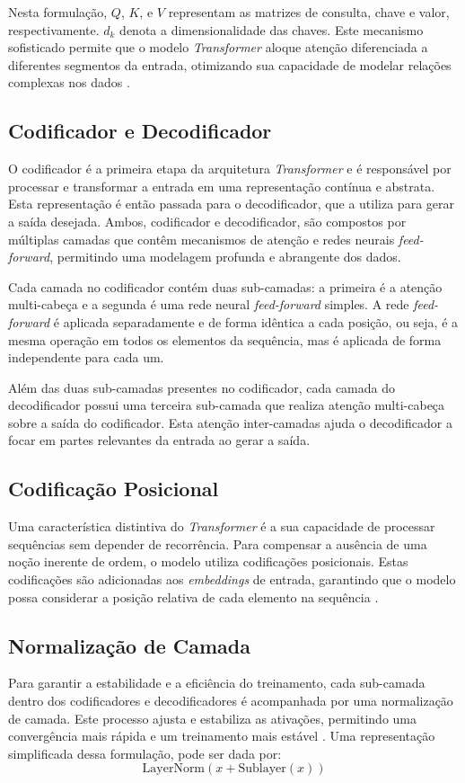 Nesta formulação, \(Q\), \(K\), e \(V\) representam as matrizes de consulta, chave e valor, respectivamente. \(d_k\) denota a dimensionalidade das chaves. Este mecanismo sofisticado permite que o modelo \textit{Transformer} aloque atenção diferenciada a diferentes segmentos da entrada, otimizando sua capacidade de modelar relações complexas nos dados \cite{vaswani2017attention}.

\subsection{Codificador e Decodificador}
O codificador é a primeira etapa da arquitetura \textit{Transformer} e é responsável por processar e transformar a entrada em uma representação contínua e abstrata. Esta representação é então passada para o decodificador, que a utiliza para gerar a saída desejada. Ambos, codificador e decodificador, são compostos por múltiplas camadas que contêm mecanismos de atenção e redes neurais \textit{feed-forward}, permitindo uma modelagem profunda e abrangente dos dados.

Cada camada no codificador contém duas sub-camadas: a primeira é a atenção multi-cabeça e a segunda é uma rede neural \textit{feed-forward} simples. A rede \textit{feed-forward} é aplicada separadamente e de forma idêntica a cada posição, ou seja, é a mesma operação em todos os elementos da sequência, mas é aplicada de forma independente para cada um.

Além das duas sub-camadas presentes no codificador, cada camada do decodificador possui uma terceira sub-camada que realiza atenção multi-cabeça sobre a saída do codificador. Esta atenção inter-camadas ajuda o decodificador a focar em partes relevantes da entrada ao gerar a saída.


\subsection{Codificação Posicional}
Uma característica distintiva do \textit{Transformer} é a sua capacidade de processar sequências sem depender de recorrência. Para compensar a ausência de uma noção inerente de ordem, o modelo utiliza codificações posicionais. Estas codificações são adicionadas aos \textit{embeddings} de entrada, garantindo que o modelo possa considerar a posição relativa de cada elemento na sequência \cite{vaswani2017attention}.

\subsection{Normalização de Camada}
Para garantir a estabilidade e a eficiência do treinamento, cada sub-camada dentro dos codificadores e decodificadores é acompanhada por uma normalização de camada. Este processo ajusta e estabiliza as ativações, permitindo uma convergência mais rápida e um treinamento mais estável \cite{ba2016layer}. Uma representação simplificada dessa formulação, pode ser dada por:
\[
\text{LayerNorm}(x + \text{Sublayer}(x))
\]

